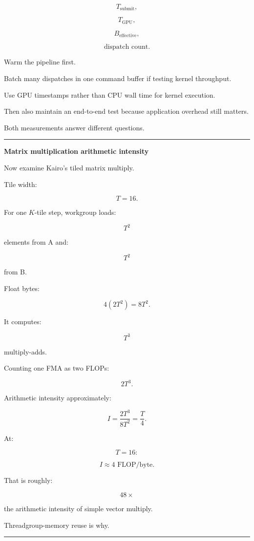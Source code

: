 \[
T_{\text{submit}},
\]

\[
T_{\text{GPU}},
\]

\[
B_{\text{effective}},
\]

\[
\text{dispatch count}.
\]

Warm the pipeline first.

Batch many dispatches in one command buffer if testing kernel throughput.

Use GPU timestamps rather than CPU wall time for kernel execution.

Then also maintain an end-to-end test because application overhead still matters.

Both measurements answer different questions.

\begin{center}\rule{0.5\linewidth}{0.5pt}\end{center}

\textbf{Matrix multiplication arithmetic intensity}

Now examine Kairo's tiled matrix multiply.

Tile width:

\[
T=16.
\]

For one \(K\)-tile step, workgroup loads:

\[
T^2
\]

elements from A and:

\[
T^2
\]

from B.

Float bytes:

\[
4(2T^2)
=
8T^2.
\]

It computes:

\[
T^3
\]

multiply-adds.

Counting one FMA as two FLOPs:

\[
2T^3.
\]

Arithmetic intensity approximately:

\[
\boxed{
I=
\frac{
2T^3
}{
8T^2
}
=
\frac T4.
}
\]

At:

\[
T=16:
\]

\[
\boxed{
I\approx4\text{ FLOP/byte}.
}
\]

That is roughly:

\[
48\times
\]

the arithmetic intensity of simple vector multiply.

Threadgroup-memory reuse is why.

\begin{center}\rule{0.5\linewidth}{0.5pt}\end{center}

